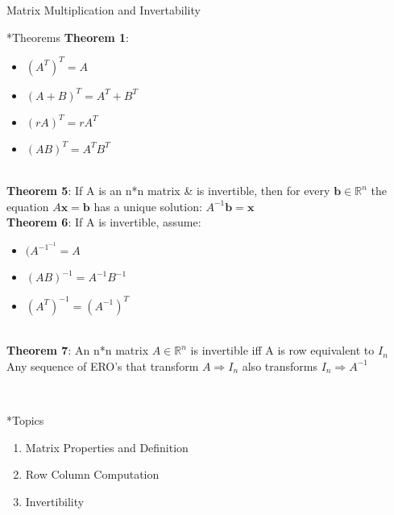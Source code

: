 \documentclass[a4paper, 12pt]{article}
\begin{document}
\newpage
\begin{section}{Matrix Multiplication and Invertability}
\begin{subsection}*{Theorems}
\textbf{Theorem 1}:
\begin{itemize}
\item{$(A^T)^T=A$}
\item{$(A+B)^T=A^T+B^T$}
\item{$(rA)^T=rA^T$}
\item{$(AB)^T=A^TB^T$}
\end{itemize} \\
\textbf{Theorem 5}: If A is an n*n matrix & is invertible, then for 
every $\textbf{b}\in\mathbb{R}^n$ the equation $A\textbf{x}=\textbf{b}$ 
has a unique solution: $A^{-1}\textbf{b}=\textbf{x}$ \\
\noindent\textbf{Theorem 6}: If A is invertible, assume:
\begin{itemize}
\item{$(A^{-1}^{-1}=A$}
\item{$(AB)^{-1}=A^{-1}B^{-1}$}
\item{$(A^{T})^{-1}=(A^{-1})^{T}$}
\end{itemize}
\\
\noindent\textbf{Theorem 7}: An n*n matrix $A\in\mathbb{R}^{n}$ is 
invertible iff A is row equivalent to $I_{n}$ \\
Any sequence of ERO's that transform $ A\Rightarrow I_{n}$ also 
transforms $I_{n} \Rightarrow A^{-1}$

\\
\end{subsection} 

\begin{subsection}*{Topics}
\begin{enumerate}
\item{Matrix Properties and Definition}
\item{Row Column Computation}
\item{Invertibility}
\end{enumerate} \end{subsection}


\end{section}
\end{document}
